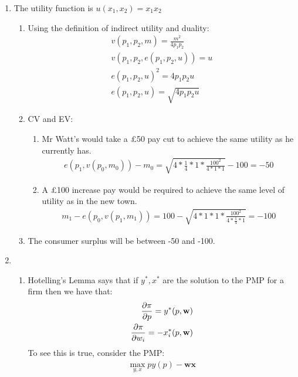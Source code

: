 \documentclass{article}
\begin{document}
    \begin{enumerate}

        \item The utility function is $u(x_1,x_2) = x_1x_2$
        \begin{enumerate}
            \item Using the definition of indirect utility and duality:
            \begin{align}
                v(p_1,p_2,m) = \frac{m^2}{4p_1p_2} \\
                v(p_1,p_2,e(p_1,p_2,u)) = u \\
                e(p_1,p_2,u)^2 = 4p_1p_2u \\
                e(p_1,p_2,u) = \sqrt{4p_1p_2u}
            \end{align}
            \item CV and EV:
            \begin{enumerate}
                \item Mr Watt's would take a £50 pay cut to achieve the same utility as he currently has.
                \begin{align}
                    e(p_1,v(p_0,m_0)) - m_0 = \sqrt{4 * \frac{1}{4} * 1 * \frac{100^2}{4 * 1 * 1}} - 100 = -50
                \end{align}
                \item A £100 increase pay would be required to achieve the same level of utility as in the new town.
                \begin{align}
                    m_1 - e(p_0,v(p_1,m_1)) = 100 - \sqrt{4 * 1 * 1 * \frac{100^2}{4 * \frac{1}{4} * 1}} = -100
                \end{align}
            \end{enumerate}
            \item The consumer surplus will be between -50 and -100.
        \end{enumerate}
        
        \item 
        \begin{enumerate}
            \item Hotelling's Lemma says that if $y^*,x^*$ are the solution to the PMP for a firm then we have that:
            \begin{align}
                \pdv{\pi}{p} = y^*(p,\textbf{w}) \\
                \pdv{\pi}{w_i} = -x^*_i(p,\textbf{w})
            \end{align}
            To see this is true, consider the PMP:
            \begin{align}
                \max_{y,x} py(p) - \textbf{wx}
            \end{align}


\end{enumerate}
\end{enumerate}
\end{document}
